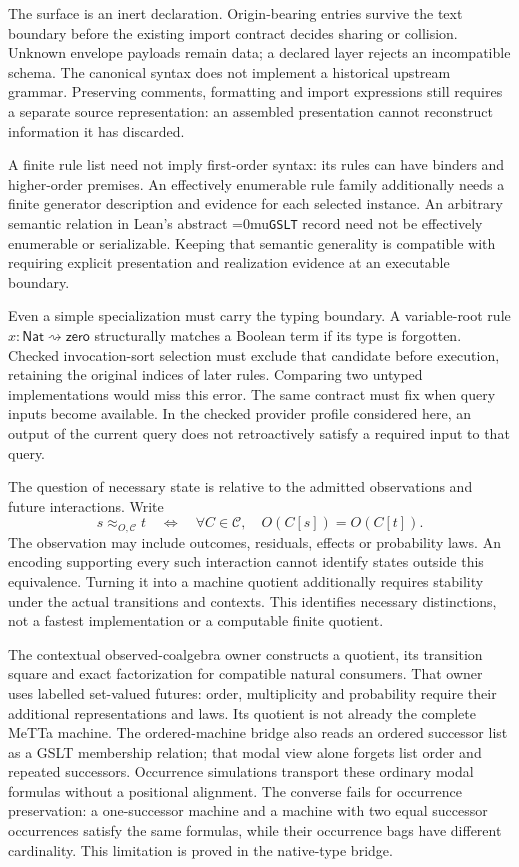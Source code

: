 \documentclass[11pt,a4paper]{article}
\newcommand{\code}[1]{\texttt{\detokenize{#1}}}
\newcommand{\name}[1]{\textup{\Urlmuskip=0mu\relax\nolinkurl{#1}}}
\begin{document}
The surface is an inert \code{(module:document payload)} declaration.
Origin-bearing entries survive the text boundary before the existing import
contract decides sharing or collision. Unknown envelope payloads remain data;
a declared layer rejects an incompatible schema. The canonical syntax does
not implement a historical upstream grammar. Preserving comments, formatting
and import expressions still requires a separate source representation:
an assembled presentation cannot reconstruct information it has discarded.

A finite rule list need not imply first-order syntax: its rules can have
binders and higher-order premises. An effectively enumerable rule family
additionally needs a finite generator description and evidence for each
selected instance. An arbitrary semantic relation in Lean's abstract
\name{GSLT} record need not be effectively enumerable or serializable.
Keeping that semantic generality is compatible with requiring explicit
presentation and realization evidence at an executable boundary.

Even a simple specialization must carry the typing boundary. A variable-root
rule $x:\mathsf{Nat}\rightsquigarrow\mathsf{zero}$ structurally matches a
Boolean term if its type is forgotten. Checked invocation-sort selection must
exclude that candidate before execution, retaining the original indices of
later rules. Comparing two untyped implementations would miss this error.
The same contract must fix when query inputs become available. In the checked
provider profile considered here, an output of the current query does not
retroactively satisfy a required input to that query.

The question of necessary state is relative to the admitted observations and
future interactions. Write
\[
 s\approx_{O,\mathcal C}t
 \quad\Longleftrightarrow\quad
 \forall C\in\mathcal C,\quad O(C[s])=O(C[t]).
\]
The observation may include outcomes, residuals, effects or probability laws.
An encoding supporting every such interaction cannot identify states outside
this equivalence. Turning it into a machine quotient additionally requires
stability under the actual transitions and contexts. This identifies necessary
distinctions, not a fastest implementation or a computable finite quotient.

The contextual observed-coalgebra owner constructs a quotient, its transition
square and exact factorization for compatible natural consumers. That owner
uses labelled set-valued futures: order, multiplicity and probability require
their additional representations and laws. Its quotient is not already the
complete MeTTa machine. The ordered-machine bridge also reads an ordered
successor list as a GSLT membership relation; that modal view alone forgets
list order and repeated successors.
Occurrence simulations transport these ordinary modal formulas without a
positional alignment. The converse fails for occurrence preservation: a
one-successor machine and a machine with two equal successor occurrences
satisfy the same formulas, while their occurrence bags have different
cardinality. This limitation is proved in the native-type bridge.
\end{document}
